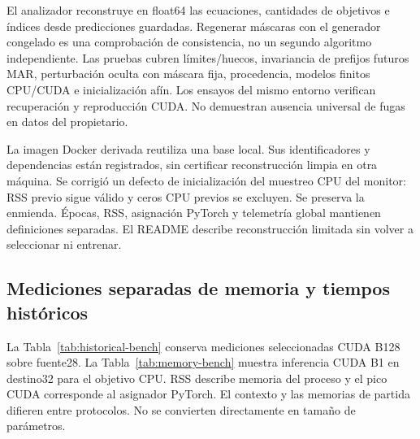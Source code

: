 El analizador reconstruye en float64 las ecuaciones, cantidades de objetivos e índices desde predicciones guardadas. Regenerar máscaras con el generador congelado es una comprobación de consistencia, no un segundo algoritmo independiente. Las pruebas cubren límites/huecos, invariancia de prefijos futuros MAR, perturbación oculta con máscara fija, procedencia, modelos finitos CPU/CUDA e inicialización afín. Los ensayos del mismo entorno verifican recuperación y reproducción CUDA. No demuestran ausencia universal de fugas en datos del propietario.

La imagen Docker derivada reutiliza una base local. Sus identificadores y dependencias están registrados, sin certificar reconstrucción limpia en otra máquina. Se corrigió un defecto de inicialización del muestreo CPU del monitor: RSS previo sigue válido y ceros CPU previos se excluyen. Se preserva la enmienda. Épocas, RSS, asignación PyTorch y telemetría global mantienen definiciones separadas. El README describe reconstrucción limitada sin volver a seleccionar ni entrenar.

\subsection{Mediciones separadas de memoria y tiempos históricos}
La Tabla~\ref{tab:historical-bench} conserva mediciones seleccionadas CUDA B128 sobre fuente28. La Tabla~\ref{tab:memory-bench} muestra inferencia CUDA B1 en destino32 para el objetivo CPU. RSS describe memoria del proceso y el pico CUDA corresponde al asignador PyTorch. El contexto y las memorias de partida difieren entre protocolos. No se convierten directamente en tamaño de parámetros.
\begin{table}[!t]
\caption{Histórico B128 CUDA directo, semilla101. RSS es pico del proceso reportado y CUDA pico de memoria asignada. Los segundos incluyen ajuste y validación.}\label{tab:historical-bench}
\centering\footnotesize
\FitTable{}
\end{table}
\begin{table}[!t]
\caption{CUDA B1 ampliado con32 servicios. RSS observado y pico del asignador CUDA en MiB. GRU-D utiliza reproducción verificada. Los totales del dispositivo se informan por separado.}\label{tab:memory-bench}
\centering\footnotesize
\FitTable{}
\end{table}
